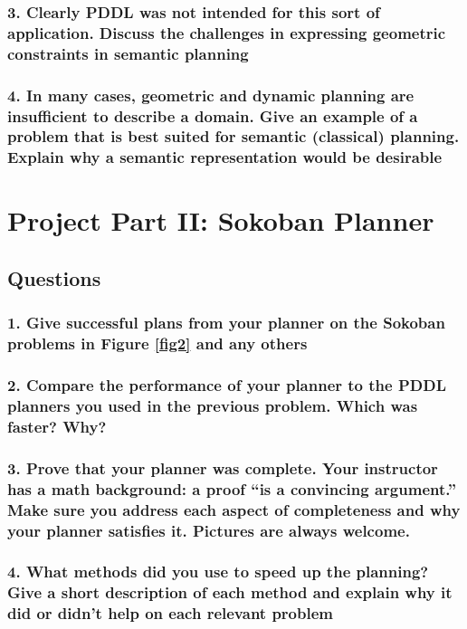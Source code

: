 \documentclass[10pt, letter]{article}
\begin{document}
\subsubsection*{3. Clearly PDDL was not intended for this sort of application. Discuss the challenges in expressing geometric constraints in semantic planning}
\subsubsection*{4. In many cases, geometric and dynamic planning are insufficient to describe a domain. Give
an example of a problem that is best suited for semantic (classical) planning. Explain why a
semantic representation would be desirable}


\section{Project Part II: Sokoban Planner}
\subsection{Questions}
\subsubsection*{1. Give successful plans from your planner on the Sokoban problems in Figure \ref{fig2} and any others}
\subsubsection*{2. Compare the performance of your planner to the PDDL planners you used in the previous
problem. Which was faster? Why?}
\subsubsection*{3. Prove that your planner was complete. Your instructor has a math background: a proof ``is
a convincing argument.'' Make sure you address each aspect of completeness and why your
planner satisfies it. Pictures are always welcome.}
\subsubsection*{4. What methods did you use to speed up the planning? Give a short description of each method
and explain why it did or didn't help on each relevant problem}
\end{document}

